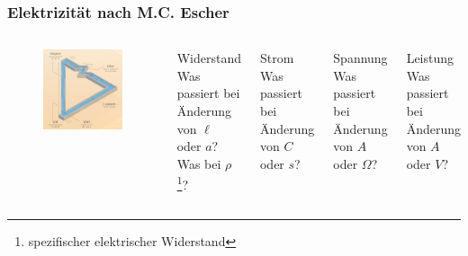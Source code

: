 \begin{frame}
	\frametitle{Elektrizität nach M.C. Escher}
  \begin{columns}
    \begin{center}
      \begin{figure}
        \includegraphics[width=\textwidth,height=.8\textheight,keepaspectratio]{e03/electricity_crop.jpg}\\
      \end{figure}
    \end{center}
    \begin{exampleblock}{Widerstand}
      Was passiert bei Änderung von $\ell$ oder $a$? Was bei $\rho$\footnote{\tiny spezifischer elektrischer Widerstand}?
    \end{exampleblock}
    \pause
    \begin{exampleblock}{Strom}
      Was passiert bei Änderung von $C$ oder $s$?
    \end{exampleblock}
    \pause
    \begin{exampleblock}{Spannung}
      Was passiert bei Änderung von $A$ oder $\Omega$?
    \end{exampleblock}
    \pause
    \begin{exampleblock}{Leistung}
      Was passiert bei Änderung von $A$ oder $V$?
    \end{exampleblock}
  \end{columns}
\end{frame}

